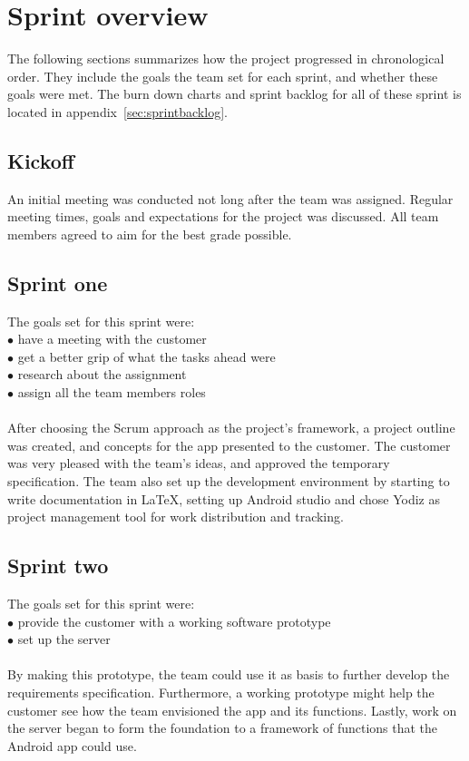 \newpage
\section{Sprint overview}
\label{sec:sprintOverview}
The following sections summarizes how the project progressed in chronological order. They include the goals the team set for each sprint, and whether these goals were met. The burn down charts and sprint backlog for all of these sprint is located in appendix~\ref{sec:sprintbacklog}.

\subsection{Kickoff}
An initial meeting was conducted not long after the team was assigned. Regular meeting times, goals and expectations for the project was discussed. All team members agreed to aim for the best grade possible.

\subsection{Sprint one}
The goals set for this sprint were:\\
$\bullet$\hspace{0.25cm} have a meeting with the customer\\
$\bullet$\hspace{0.25cm} get a better grip of what the tasks ahead were\\
$\bullet$\hspace{0.25cm} research about the assignment\\
$\bullet$\hspace{0.25cm} assign all the team members roles\\\\
After choosing the Scrum approach as the project's framework, a project outline was created, and concepts for the app presented to the customer. The customer was very pleased with the team's ideas, and approved the temporary specification. The team also set up the development environment by starting to write documentation in \LaTeX, setting up Android studio and chose Yodiz as project management tool for work distribution and tracking.

\subsection{Sprint two}
The goals set for this sprint were:\\
$\bullet$\hspace{0.25cm} provide the customer with a working software prototype\\
$\bullet$\hspace{0.25cm} set up the server\\\\
By making this prototype, the team could use it as basis to further develop the requirements specification. Furthermore, a working prototype might help the customer see how the team envisioned the app and its functions. Lastly, work on the server began to form the foundation to a framework of functions that the Android app could use. 

